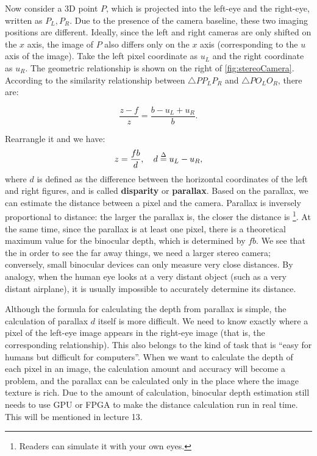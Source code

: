 Now consider a 3D point $P$, which is projected into the left-eye and the right-eye, written as $P_L, P_R$. Due to the presence of the camera baseline, these two imaging positions are different. Ideally, since the left and right cameras are only shifted on the $x$ axis, the image of $P$ also differs only on the $x$ axis (corresponding to the $u$ axis of the image). Take the left pixel coordinate as $u_L$ and the right coordinate as $u_R$. The geometric relationship is shown on the right of \autoref{fig:stereoCamera}. According to the similarity relationship between $ \triangle P P_L P_R$ and $\triangle P O_L O_R$, there are:

\begin{equation}
\frac{{z - f}}{z} = \frac{{b - {u_L} + {u_R}}}{b}.
\end{equation}

Rearrangle it and we have:
\begin{equation}
z = \frac{{fb}}{d}, \quad d \buildrel \Delta \over = {u_L} - {u_R},
\end{equation}
where $d$ is defined as the difference between the horizontal coordinates of the left and right figures, and is called \textbf{disparity} or \textbf{parallax}. Based on the parallax, we can estimate the distance between a pixel and the camera. Parallax is inversely proportional to distance: the larger the parallax is, the closer the distance is \footnote {Readers can simulate it with your own eyes.}. At the same time, since the parallax is at least one pixel, there is a theoretical maximum value for the binocular depth, which is determined by $fb$. We see that the in order to see the far away things, we need a larger stereo camera; conversely, small binocular devices can only measure very close distances. By analogy, when the human eye looks at a very distant object (such as a very distant airplane), it is usually impossible to accurately determine its distance.

Although the formula for calculating the depth from parallax is simple, the calculation of parallax $d$ itself is more difficult. We need to know exactly where a pixel of the left-eye image appears in the right-eye image (that is, the corresponding relationship). This also belongs to the kind of task that is ``easy for humans but difficult for computers''. When we want to calculate the depth of each pixel in an image, the calculation amount and accuracy will become a problem, and the parallax can be calculated only in the place where the image texture is rich. Due to the amount of calculation, binocular depth estimation still needs to use GPU or FPGA to make the distance calculation run in real time. This will be mentioned in lecture 13.

